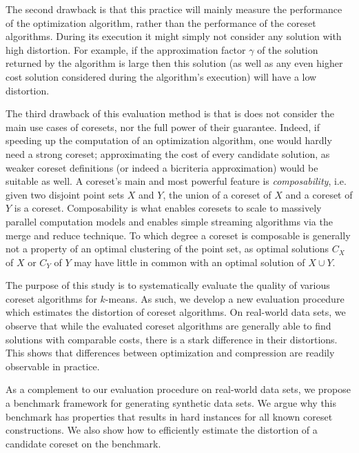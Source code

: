 The second drawback is that this practice will mainly measure the performance of the optimization algorithm, rather than the performance of the coreset algorithms. During its execution it might simply not consider any solution with high distortion. For example, if the approximation factor $\gamma$ of the solution returned by the algorithm is large then this solution (as well as any even higher cost solution considered during the algorithm’s execution) will have a low distortion. 

The third drawback of this evaluation method is that is does not consider the main use cases of coresets, nor the full power of their guarantee. Indeed, if speeding up the computation of an optimization algorithm, one would hardly need a strong coreset; approximating the cost of every candidate solution, as weaker coreset definitions (or indeed a bicriteria approximation) would be suitable as well. A coreset's main and most powerful feature is \emph{composability}, i.e. given two disjoint point sets $X$ and $Y$, the union of a coreset of $X$ and a coreset of $Y$ is a coreset. Composability is what enables coresets to scale to massively parallel computation models and enables simple streaming algorithms via the merge and reduce technique. To which degree a coreset is composable is generally not a property of an optimal clustering of the point set, as optimal solutions $C_X$ of $X$ or $C_Y$ of $Y$ may have little in common with an optimal solution of $X\cup Y$. 


The purpose of this study is to systematically evaluate the quality of various coreset algorithms for $k$-means. As such, we develop a new evaluation procedure which estimates the distortion of coreset algorithms. On real-world data sets, we observe that while the evaluated coreset algorithms are generally able to find solutions with comparable costs, there is a stark difference in their distortions. This shows that differences between optimization and compression are readily observable in practice.

As a complement to our evaluation procedure on real-world data sets, we propose a benchmark framework for generating synthetic data sets. We argue why this benchmark has properties that results in hard instances for all known coreset constructions. We also show how to efficiently estimate the distortion of a candidate coreset on the benchmark.



